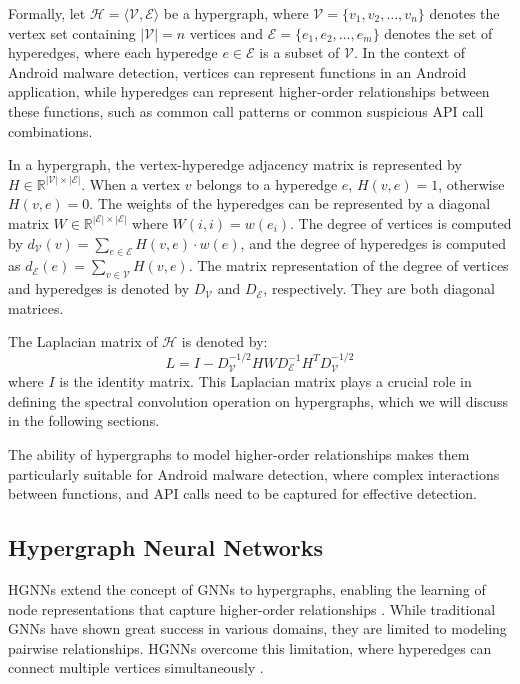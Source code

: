 \documentclass[runningheads]{llncs}
\begin{document}
Formally, let $\mathcal{H} = \langle \mathcal{V}, \mathcal{E} \rangle$ be a hypergraph, where $\mathcal{V} = \{v_1, v_2, \ldots, v_n\}$ denotes the vertex  set containing $|\mathcal{V}| = n$ vertices and $\mathcal{E} = \{e_1, e_2, \ldots, e_m\}$ denotes the set of hyperedges, where each hyperedge $e \in \mathcal{E}$ is a subset of $\mathcal{V}$. In the context of Android malware detection, vertices can represent functions in an Android application, while hyperedges can represent higher-order relationships between these functions, such as common call patterns or common suspicious API call combinations.

In a hypergraph, the vertex-hyperedge adjacency matrix is represented by $H \in \mathbb{R}^{|\mathcal{V}| \times |\mathcal{E}|}$. When a vertex $v$ belongs to a hyperedge $e$, $H(v, e) = 1$, otherwise $H(v, e) = 0$. The weights of the hyperedges can be represented by a diagonal matrix $W \in \mathbb{R}^{|\mathcal{E}| \times |\mathcal{E}|}$ where $W(i, i) = w(e_i)$. The degree of vertices is computed by $d_{\mathcal{V}}(v) = \sum_{e \in \mathcal{E}} H(v, e) \cdot w(e)$, and the degree of hyperedges is computed as $d_{\mathcal{E}}(e) = \sum_{v \in \mathcal{V}} H(v, e)$. The matrix representation of the degree of vertices and hyperedges is denoted by $D_{\mathcal{V}}$ and $D_{\mathcal{E}}$, respectively. They are both diagonal matrices.

The Laplacian matrix of $\mathcal{H}$ is denoted by:
\begin{equation}
L = I - D_{\mathcal{V}}^{-1/2}HWD_{\mathcal{E}}^{-1}H^TD_{\mathcal{V}}^{-1/2}
\end{equation}
where $I$ is the identity matrix. This Laplacian matrix plays a crucial role in defining the spectral convolution operation on hypergraphs, which we will discuss in the following sections.



The ability of hypergraphs to model higher-order relationships makes them particularly suitable for Android malware detection, where complex interactions between functions, and API calls need to be captured for effective detection.

\subsection{Hypergraph Neural Networks}
HGNNs extend the concept of GNNs to hypergraphs, enabling the learning of node representations that capture higher-order relationships \cite{feng2019}. While traditional GNNs have shown great success in various domains, they are limited to modeling pairwise relationships. HGNNs overcome this limitation, where hyperedges can connect multiple vertices simultaneously \cite{zhou2006learning}. 
\end{document}
